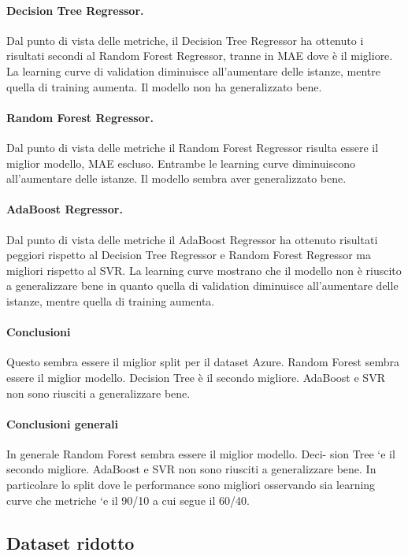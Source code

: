 \paragraph{\textbf{Decision Tree Regressor}.}
Dal punto di vista delle metriche, il Decision Tree Regressor ha ottenuto i risultati secondi al Random Forest Regressor, tranne in MAE dove è il migliore.
La learning curve di validation diminuisce all'aumentare delle istanze, mentre quella di training aumenta. Il modello non ha generalizzato bene.
\paragraph{\textbf{Random Forest Regressor}.}
Dal punto di vista delle metriche il Random Forest Regressor risulta essere il miglior modello, MAE escluso. Entrambe le learning curve diminuiscono all'aumentare delle istanze. Il modello sembra aver generalizzato bene.
\paragraph{\textbf{AdaBoost Regressor}.}
Dal punto di vista delle metriche il AdaBoost Regressor ha ottenuto risultati peggiori rispetto al Decision Tree Regressor e Random Forest Regressor ma migliori rispetto al SVR.
La learning curve mostrano che il modello non è riuscito a generalizzare bene in quanto quella di validation diminuisce all'aumentare delle istanze, mentre quella di training aumenta.

\paragraph{\textbf{Conclusioni}} Questo sembra essere il miglior split per il dataset Azure. Random Forest sembra essere il miglior modello. Decision Tree è il secondo migliore. AdaBoost e SVR non sono riusciti a generalizzare bene.
\newpage

\paragraph{\textbf{Conclusioni generali}}

In generale Random Forest sembra essere il miglior modello. Deci-
sion Tree `e il secondo migliore. AdaBoost e SVR non sono riusciti a generalizzare bene. In
particolare lo split dove le performance sono migliori osservando sia learning curve che metriche
`e il 90/10 a cui segue il 60/40.



\subsection{Dataset ridotto}

